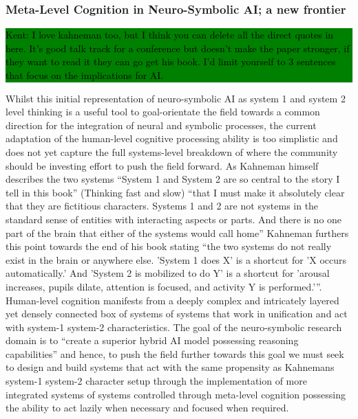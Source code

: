 \documentclass[hf]{ceurart}
\newcommand{\pinaforecomment}[4]{\colorbox{#1}{\textcolor{#4}{\parbox{.8\linewidth}{#2: #3}}}}
\newcommand{\osullikomment}[1]{\pinaforecomment{green}{Kent}{#1}{black}}
\begin{document}
\subsubsection{Meta-Level Cognition in Neuro-Symbolic AI; a new frontier}
\osullikomment{I love kahneman too, but I think you can delete all the direct quotes in here. It's good talk track for a conference but doesn't make the paper stronger, if they want to read it they can go get his book. I'd limit yourself to 3 sentences that focus on the implications for AI. }
Whilst this initial representation of neuro-symbolic AI as system 1 and system 2 level thinking is a useful tool to goal-orientate the field towards a common direction for the integration of neural and symbolic processes, the current adaptation of the human-level cognitive processing ability is too simplistic and does not yet capture the full systems-level breakdown of where the community should be investing effort to push the field forward. As Kahneman himself describes the two systems \enquote{System 1 and System 2 are so central to the story I tell in this book} (Thinking fast and slow) \enquote{that I must make it absolutely clear that they are fictitious characters. Systems 1 and 2 are not systems in the standard sense of entities with interacting aspects or parts. And there is no one part of the brain that either of the systems would call home} Kahneman furthers this point towards the end of his book stating \enquote{the two systems do not really exist in the brain or anywhere else. 'System 1 does X' is a shortcut for 'X occurs automatically.' And 'System 2 is mobilized to do Y' is a shortcut for 'arousal increases, pupils dilate, attention is focused, and activity Y is performed.'}. Human-level cognition manifests from a deeply complex and intricately layered yet densely connected box of systems of systems that work in unification and act with system-1 system-2 characteristics. The goal of the neuro-symbolic research domain is to \enquote{create a superior hybrid AI model possessing reasoning capabilities} and hence, to push the field further towards this goal we must seek to design and build systems that act with the same propensity as Kahnemans system-1 system-2 character setup through the implementation of more integrated systems of systems controlled through meta-level cognition possessing the ability to act lazily when necessary and focused when required. 
\end{document}
